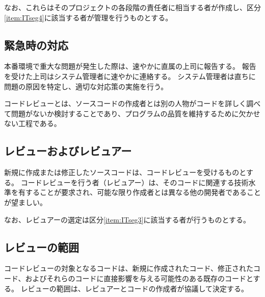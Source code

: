 なお、これらはそのプロジェクトの各段階の責任者に相当する者が作成し、区分\ref{item:ITseg4}\hx に該当する者が管理を行うものとする。

\subsection{緊急時の対応}
本番環境で重大な問題が発生した際は、速やかに直属の上司に報告する。
報告を受けた上司はシステム管理者に速やかに連絡する。
システム管理者は直ちに問題の原因を特定し、適切な対応策の実施を行う。



\clearpage
コードレビューとは、ソースコードの作成者とは別の人物がコードを詳しく調べて問題がないか検討することであり、プログラムの品質を維持するために欠かせない工程である。

\subsection{レビューおよびレビュアー}
新規に作成または修正したソースコードは、コードレビューを受けるものとする。
コードレビューを行う者（レビュアー）は、そのコードに関連する技術水準を有することが要求され、可能な限り作成者とは異なる他の開発者であることが望ましい。

なお、レビュアーの選定は区分\ref{item:ITseg3}\hx に該当する者が行うものとする。

\subsection{レビューの範囲}
コードレビューの対象となるコードは、新規に作成されたコード、修正されたコード、およびそれらのコードに直接影響を与える可能性のある既存のコードとする。
レビューの範囲は、レビュアーとコードの作成者が協議して決定する。

